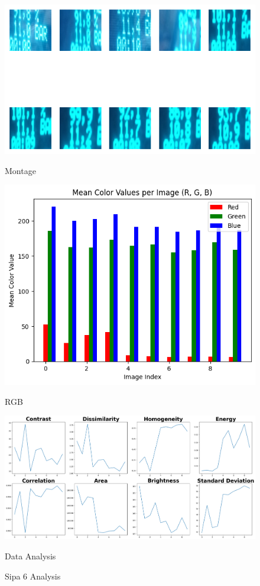 \begin{figure}[ht]
    \centering
    \begin{minipage}[t]{0.25\textwidth}
        \centering
        \includegraphics[width=\textwidth]{Figures/EDA_Charts/6/montage.png}
        \caption*{Montage}
    \end{minipage}\hfill
    \begin{minipage}[t]{0.25\textwidth}
        \centering
        \includegraphics[width=\textwidth]{Figures/EDA_Charts/6/rgb.png}
        \caption*{RGB}
    \end{minipage}\hfill
    \begin{minipage}[t]{0.50\textwidth}
        \centering
        \includegraphics[width=\textwidth]{Figures/EDA_Charts/6/da.png}
        \caption*{Data Analysis}
    \end{minipage}
    \caption{Sipa 6 Analysis}
    \label{fig:Sipa 6 Analysis}
\end{figure}

